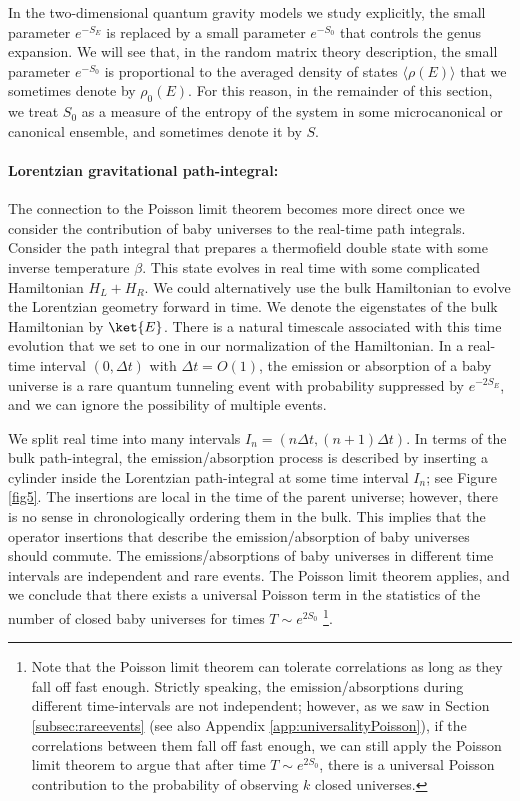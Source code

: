 \documentclass[a4paper,11pt]{article}
\theoremstyle{definition}
\numberwithin{equation}{section}
\begin{document}
In the two-dimensional quantum gravity models we study explicitly, the small parameter $e^{-S_E}$ is replaced by a small parameter $e^{-S_0}$ that controls the genus expansion. We will see that, in the random matrix theory description, the small parameter $e^{-S_0}$ is proportional to the averaged density of states $\langle\rho(E)\rangle$ that we sometimes denote by $\rho_0(E)$. For this reason, in the remainder of this section, we treat $S_0$ as a measure of the entropy of the system in some microcanonical or canonical ensemble, and sometimes denote it by $S$.

\paragraph{Lorentzian gravitational path-integral:} The connection to the Poisson limit theorem becomes more direct once we consider the contribution of baby universes to the real-time path integrals. Consider the path integral that prepares a thermofield double state with some inverse temperature $\beta$. 
This state evolves in real time with some complicated Hamiltonian $H_L+H_R$. We could alternatively use the bulk Hamiltonian to evolve the Lorentzian geometry forward in time. We denote the eigenstates of the bulk Hamiltonian by $\ket{E}$. There is a natural timescale associated with this time evolution that we set to one in our normalization of the Hamiltonian. In a real-time interval $(0, \Delta t)$ with $\Delta t=O(1)$, the emission or absorption of a baby universe is a rare quantum tunneling event with probability suppressed by $e^{-2S_E}$, and we can ignore the possibility of multiple events.




We split real time into many intervals $I_n=(n\Delta t,(n+1)\Delta t)$. In terms of the bulk path-integral, the emission/absorption process is described by inserting a cylinder inside the Lorentzian path-integral at some time interval $I_n$; see Figure \ref{fig5}. 
The insertions are local in the time of the parent universe; however, there is no sense in chronologically ordering them in the bulk. This implies that the operator insertions that describe the emission/absorption of baby universes should commute. 
The emissions/absorptions of baby universes in different time intervals are independent and rare events. The Poisson limit theorem applies, and we conclude that there exists a universal Poisson term in the statistics of the number of closed baby universes for times $T\sim e^{2S_0}$ \footnote{Note that the Poisson limit theorem can tolerate correlations as long as they fall off fast enough. Strictly speaking, the emission/absorptions during different time-intervals are not independent; however, as we saw in Section \ref{subsec:rareevents} (see also Appendix \ref{app:universalityPoisson}), if the correlations between them fall off fast enough, we can still apply the Poisson limit theorem to argue that after time $T\sim e^{2S_0}$, there is a universal Poisson contribution to the probability of observing $k$ closed universes.}.
\end{document}
